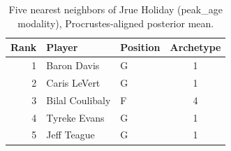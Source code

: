 \begin{table}[htbp]
  \centering\small
  \begin{tabular}{rllc}
    \toprule
    Rank & Player & Position & Archetype \\
    \midrule
    1 & Baron Davis & G & 1 \\
    2 & Caris LeVert & G & 1 \\
    3 & Bilal Coulibaly & F & 4 \\
    4 & Tyreke Evans & G & 1 \\
    5 & Jeff Teague & G & 1 \\
    \bottomrule
  \end{tabular}
  \caption{Five nearest neighbors of Jrue Holiday (peak_age modality), Procrustes-aligned posterior mean.}
  \label{tab:Jrue_Holiday_neighbors_peak_age}
\end{table}

